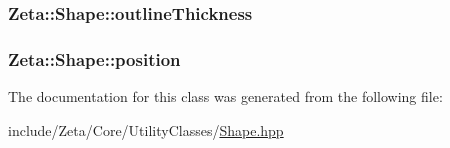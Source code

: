 \hypertarget{classZeta_1_1Shape_ad7939b5b43a612405ef8807b0202fd64}{
\subsubsection[{outline\+Thickness}]{ Zeta\+::\+Shape\+::outline\+Thickness\hspace{0.3cm}{\ttfamily [protected]}}}\label{classZeta_1_1Shape_ad7939b5b43a612405ef8807b0202fd64}
\hypertarget{classZeta_1_1Shape_ab60c908376dd309194138fe775230e4b}{
\subsubsection[{position}]{ Zeta\+::\+Shape\+::position\hspace{0.3cm}{\ttfamily [protected]}}}\label{classZeta_1_1Shape_ab60c908376dd309194138fe775230e4b}


The documentation for this class was generated from the following file\+:\begin{DoxyCompactItemize}
\item 
include/\+Zeta/\+Core/\+Utility\+Classes/\hyperlink{Shape_8hpp}{Shape.\+hpp}\end{DoxyCompactItemize}
